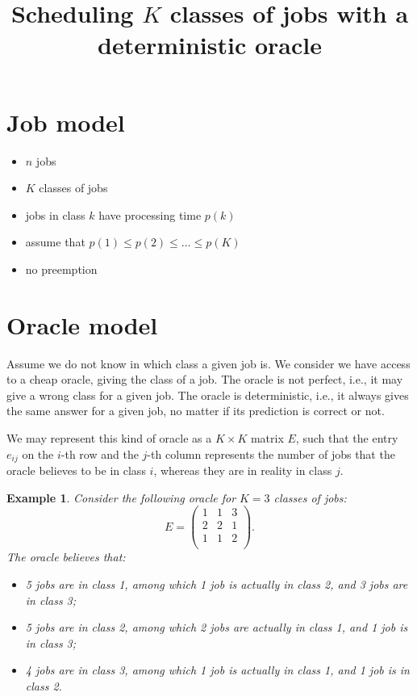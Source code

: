\documentclass{article}
\title{Scheduling \(K\) classes of jobs with a deterministic oracle}
\newtheorem{example}{Example}
\begin{document}
\maketitle

\section{Job model}

\begin{itemize}
    \item \(n\) jobs
    \item \(K\) classes of jobs
    \item jobs in class \(k\) have processing time \(p(k)\)
    \item assume that \(p(1)\le p(2)\le\dots\le p(K)\)
    \item no preemption
\end{itemize}

\section{Oracle model}

Assume we do not know in which class a given job is. We consider we have access to a cheap oracle, giving the class of a
job. The oracle is not perfect, i.e., it may give a wrong class for a given job. The oracle is deterministic, i.e., it
always gives the same answer for a given job, no matter if its prediction is correct or not.

We may represent this kind of oracle as a \(K\times K\) matrix \(E\), such that the entry \(e_{ij}\) on the \(i\)-th row
and the \(j\)-th column represents the number of jobs that the oracle believes to be in class \(i\), whereas they are in
reality in class \(j\).

\begin{example}
    Consider the following oracle for \(K=3\) classes of jobs:
    \[
        E=\begin{pmatrix}
            1 & 1 & 3 \\
            2 & 2 & 1 \\
            1 & 1 & 2 \\
        \end{pmatrix}.
    \]
    The oracle believes that:
    \begin{itemize}
        \item 5 jobs are in class 1, among which 1 job is actually in class 2, and 3 jobs are in class 3;
        \item 5 jobs are in class 2, among which 2 jobs are actually in class 1, and 1 job is in class 3;
        \item 4 jobs are in class 3, among which 1 job is actually in class 1, and 1 job is in class 2.
    \end{itemize}
\end{example}
\end{document}
